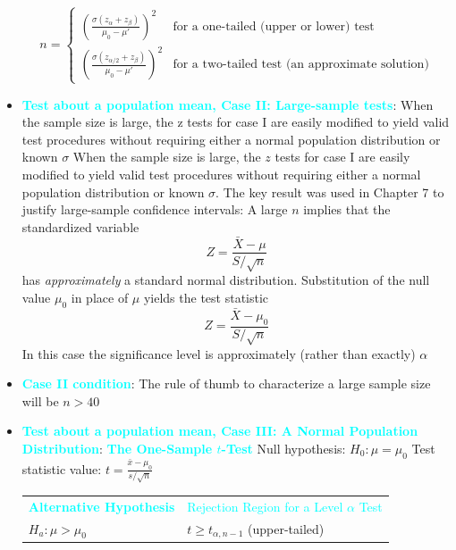 \documentclass{report}
\begin{document}
\begin{itemize}
    \[
        n = 
        \begin{cases} 
            \left( \frac{\sigma (z_\alpha + z_\beta)}{\mu_0 - \mu'} \right)^2 & \text{for a one-tailed (upper or lower) test} \\ 
            \left( \frac{\sigma (z_{\alpha/2} + z_\beta)}{\mu_0 - \mu'} \right)^2 & \text{for a two-tailed test (an approximate solution)}
        \end{cases}
    \]
    \item \textbf{\textcolor{cyan}{Test about a population mean, Case II: Large-sample tests}}:
        When the sample size is large, the z tests for case I are easily modified to yield valid test procedures without requiring either a normal population distribution or known $\sigma$
        \bigbreak \noindent 
        When the sample size is large, the \( z \) tests for case I are easily modified to yield valid test procedures without requiring either a normal population distribution or known \( \sigma \). The key result was used in Chapter 7 to justify large-sample confidence intervals: A large \( n \) implies that the standardized variable
        \[
            Z = \frac{\bar{X} - \mu}{S/\sqrt{n}}
        \]
        has \textit{approximately} a standard normal distribution. Substitution of the null value \( \mu_0 \) in place of \( \mu \) yields the test statistic
        \[
            Z = \frac{\bar{X} - \mu_0}{S/\sqrt{n}}
        \]
        \bigbreak \noindent 
        In this case the significance level is approximately (rather than exactly) $\alpha$
    \item \textbf{\textcolor{cyan}{Case II condition}}: The rule of thumb to characterize a large sample size will be $n > 40$
        \pagebreak \bigbreak \noindent 
    \item \textbf{\textcolor{cyan}{Test about a population mean, Case III: A Normal Population Distribution}}:
        \bigbreak \noindent 
        \textbf{\textcolor{cyan}{The One-Sample \( t \)-Test}}
        \bigbreak \noindent 
        Null hypothesis: \( H_0: \mu = \mu_0 \)
        \bigbreak \noindent 
        Test statistic value: \( t = \frac{\bar{x} - \mu_0}{s/\sqrt{n}} \)
        \bigbreak \noindent 
        \begin{tabular}{>{\bfseries}l l}
            \noindent \textcolor{cyan}{Alternative Hypothesis} & \textcolor{cyan}{Rejection Region for a Level \( \alpha \) Test} \\
            $H_a: \mu > \mu_0$ & $t \ge t_{\alpha, n-1}$ (upper-tailed) \\

\end{tabular}
\end{itemize}
\end{document}
